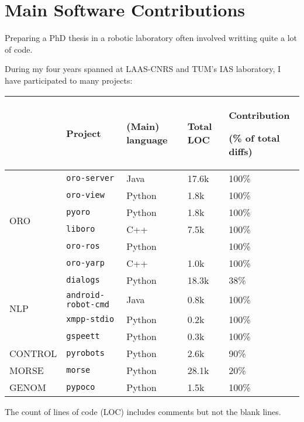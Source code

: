 \chapter{Main Software Contributions}
\label{chapt|software-contrib}

Preparing a PhD thesis in a robotic laboratory often involved writting quite a
lot of code.

During my four years spanned at LAAS-CNRS and TUM's IAS laboratory, I have
participated to many projects:

\begin{center}

\begin{tabular}{llllp{4cm}}
\toprule
 & {\bf Project} & (Main) language & Total LOC & Contribution \par (\% of total diffs) \\
\midrule

\multirow{6}{1cm}{ORO} & {\tt oro-server} & Java & 17.6k & 100\% \\
 & {\tt oro-view} & Python & 1.8k & 100\% \\
 & {\tt pyoro} & Python & 1.8k & 100\% \\
 & {\tt liboro} & C++ & 7.5k & 100\% \\
 & {\tt oro-ros} & Python & & 100\% \\
 & {\tt oro-yarp} & C++ & 1.0k & 100\% \\
\midrule
\multirow{4}{1cm}{NLP} & {\tt dialogs} & Python & 18.3k & 38\% \\
 & {\tt android-robot-cmd} & Java & 0.8k & 100\% \\
 & {\tt xmpp-stdio} & Python & 0.2k & 100\% \\
 & {\tt gspeett} & Python & 0.3k & 100\% \\
\midrule
CONTROL & {\tt pyrobots} & Python & 2.6k & 90\% \\
\midrule
MORSE & {\tt morse} & Python & 28.1k & 20\% \\
\midrule
GENOM & {\tt pypoco} & Python & 1.5k & 100\% \\
\bottomrule

\end{tabular}
\end{center}


The count of lines of code (LOC) includes comments but not the blank lines.

